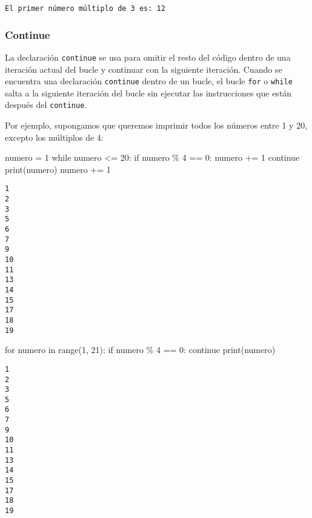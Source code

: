 \documentclass[
  letterpaper,
  DIV=11,
  numbers=noendperiod]{scrreprt}
\newenvironment{Shaded}{\begin{snugshade}}{\end{snugshade}}
\newcommand{\BuiltInTok}[1]{\textcolor[rgb]{0.00,0.23,0.31}{#1}}
\newcommand{\ControlFlowTok}[1]{\textcolor[rgb]{0.00,0.23,0.31}{#1}}
\newcommand{\DecValTok}[1]{\textcolor[rgb]{0.68,0.00,0.00}{#1}}
\newcommand{\KeywordTok}[1]{\textcolor[rgb]{0.00,0.23,0.31}{#1}}
\newcommand{\NormalTok}[1]{\textcolor[rgb]{0.00,0.23,0.31}{#1}}
\newcommand{\OperatorTok}[1]{\textcolor[rgb]{0.37,0.37,0.37}{#1}}
\begin{document}
\begin{verbatim}
El primer número múltiplo de 3 es: 12
\end{verbatim}

\subsubsection{Continue}\label{continue}

La declaración \texttt{continue} se usa para omitir el resto del código
dentro de una iteración actual del bucle y continuar con la siguiente
iteración. Cuando se encuentra una declaración \texttt{continue} dentro
de un bucle, el bucle \texttt{for} o \texttt{while} salta a la siguiente
iteración del bucle sin ejecutar las instrucciones que están después del
\texttt{continue}.

Por ejemplo, supongamos que queremos imprimir todos los números entre 1
y 20, excepto los múltiplos de 4:

\begin{Shaded}
\begin{Highlighting}[]
\NormalTok{numero }\OperatorTok{=} \DecValTok{1}
\ControlFlowTok{while}\NormalTok{ numero }\OperatorTok{\textless{}=} \DecValTok{20}\NormalTok{:}
  \ControlFlowTok{if}\NormalTok{ numero }\OperatorTok{\%} \DecValTok{4} \OperatorTok{==} \DecValTok{0}\NormalTok{:}
\NormalTok{      numero }\OperatorTok{+=} \DecValTok{1}
      \ControlFlowTok{continue}
  \BuiltInTok{print}\NormalTok{(numero)}
\NormalTok{  numero }\OperatorTok{+=} \DecValTok{1}
\end{Highlighting}
\end{Shaded}

\begin{verbatim}
1
2
3
5
6
7
9
10
11
13
14
15
17
18
19
\end{verbatim}

\begin{Shaded}
\begin{Highlighting}[]
\ControlFlowTok{for}\NormalTok{ numero }\KeywordTok{in} \BuiltInTok{range}\NormalTok{(}\DecValTok{1}\NormalTok{, }\DecValTok{21}\NormalTok{):}
  \ControlFlowTok{if}\NormalTok{ numero }\OperatorTok{\%} \DecValTok{4} \OperatorTok{==} \DecValTok{0}\NormalTok{:}
      \ControlFlowTok{continue}
  \BuiltInTok{print}\NormalTok{(numero)}
\end{Highlighting}
\end{Shaded}

\begin{verbatim}
1
2
3
5
6
7
9
10
11
13
14
15
17
18
19
\end{verbatim}
\end{document}
